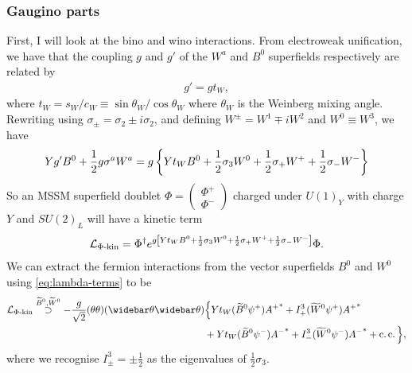 \documentclass[english, notitlepage]{article}
\begin{document}
            \subsubsection{Gaugino parts}
                First, I will look at the bino and wino interactions. From electroweak unification, we have that the coupling $g$ and $g'$ of the $W^a$ and $B^0$ superfields respectively are related by
                \begin{align}
                    g' = g t_W,
                \end{align}
                where $t_W = s_W/c_W \equiv \sin\theta_W/\cos\theta_W$ where $\theta_W$ is the Weinberg mixing angle.
                Rewriting using $\sigma_\pm = \sigma_2 \pm i\sigma_2$, and defining $W^\pm = W^1 \mp iW^2$ and $W^0 \equiv W^3$, we have
                \begin{align}
                    Yg'B^0 + \frac{1}{2}g\sigma^a W^a = g\left\{ Yt_W B^0 + \frac{1}{2}\sigma_3 W^0 + \frac{1}{2}\sigma_+ W^+ + \frac{1}{2}\sigma_- W^- \right\}
                \end{align}
                So an MSSM superfield doublet $\Phi = \begin{pmatrix} \Phi^+ \\ \Phi^- \end{pmatrix}$ charged under ${U(1)}_Y$ with charge $Y$ and ${SU(2)}_L$ will have a kinetic term
                \begin{align}
                    \mathcal{L}_{\Phi\text{-kin}} = \Phi^\dag e^{g\left[ Yt_W B^0 + \frac{1}{2}\sigma_3 W^0 + \frac{1}{2}\sigma_+ W^+ + \frac{1}{2}\sigma_- W^- \right]} \Phi.
                \end{align}
                We can extract the fermion interactions from the vector superfields $B^0$ and $W^0$ using \cref{eq:lambda-terms} to be
                \begin{align} \nonumber
                    \L_{\Phi\text{-kin}} \stackrel{\bino, \wino}{\supset} -\frac{g}{\sqrt{2}} (\theta\theta)(\wbar\theta\wbar\theta)& \Big\{ Yt_W (\bino \psi^+) {A^+}^* + I^3_+ (\wino \psi^+) {A^+}^* \\
                    &+ Yt_W (\bino\psi^-){A^-}^* + I^3_- (\wino \psi^-){A^-}^* + \cc \Big\},
                \end{align}
                where we recognise $I^3_\pm = \pm \frac{1}{2}$ as the eigenvalues of $\frac{1}{2}\sigma_3$.
\end{document}
